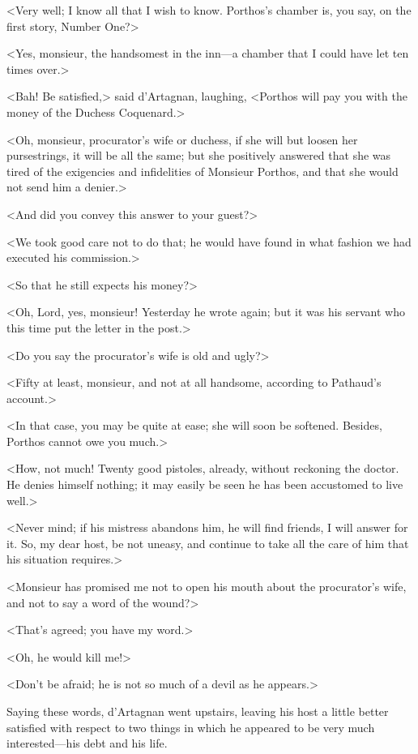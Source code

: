 <Very well; I know all that I wish to know. Porthos's chamber is, you say, on the first story, Number One?> 

<Yes, monsieur, the handsomest in the inn---a chamber that I could have let ten times over.> 

<Bah! Be satisfied,> said d'Artagnan, laughing, <Porthos will pay you with the money of the Duchess Coquenard.> 

<Oh, monsieur, procurator's wife or duchess, if she will but loosen her pursestrings, it will be all the same; but she positively answered that she was tired of the exigencies and infidelities of Monsieur Porthos, and that she would not send him a denier.> 

<And did you convey this answer to your guest?> 

<We took good care not to do that; he would have found in what fashion we had executed his commission.> 

<So that he still expects his money?> 

<Oh, Lord, yes, monsieur! Yesterday he wrote again; but it was his servant who this time put the letter in the post.> 

<Do you say the procurator's wife is old and ugly?> 

<Fifty at least, monsieur, and not at all handsome, according to Pathaud's account.> 

<In that case, you may be quite at ease; she will soon be softened. Besides, Porthos cannot owe you much.> 

<How, not much! Twenty good pistoles, already, without reckoning the doctor. He denies himself nothing; it may easily be seen he has been accustomed to live well.> 

<Never mind; if his mistress abandons him, he will find friends, I will answer for it. So, my dear host, be not uneasy, and continue to take all the care of him that his situation requires.> 

<Monsieur has promised me not to open his mouth about the procurator's wife, and not to say a word of the wound?> 

<That's agreed; you have my word.> 

<Oh, he would kill me!> 

<Don't be afraid; he is not so much of a devil as he appears.> 

Saying these words, d'Artagnan went upstairs, leaving his host a little better satisfied with respect to two things in which he appeared to be very much interested---his debt and his life. 

